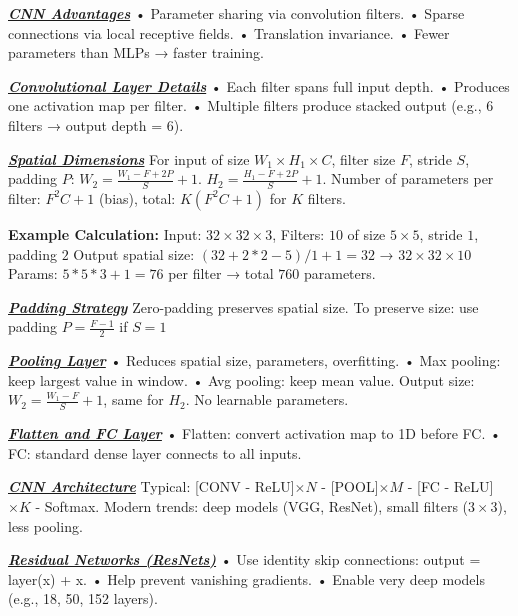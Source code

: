 \documentclass[10pt]{article}
\newcommand{\bulletPoint}[1]{\ul{\textit{\textbf{#1}}}}
\begin{document}
\begin{multicols*}{2}
\bulletPoint{CNN Advantages} \quad
• Parameter sharing via convolution filters. \quad
• Sparse connections via local receptive fields. \quad
• Translation invariance. \quad
• Fewer parameters than MLPs → faster training.

\bulletPoint{Convolutional Layer Details} \quad
• Each filter spans full input depth. \quad
• Produces one activation map per filter. \quad
• Multiple filters produce stacked output (e.g., 6 filters → output depth = 6). 

\bulletPoint{Spatial Dimensions} \quad
For input of size $W_1 \times H_1 \times C$, filter size $F$, stride $S$, padding $P$:
$W_2 = \frac{W_1 - F + 2P}{S} + 1$. \quad
$H_2 = \frac{H_1 - F + 2P}{S} + 1$. \quad
Number of parameters per filter: $F^2 C + 1$ (bias), \quad total: $K(F^2C + 1)$ for $K$ filters.\quad

\textbf{Example Calculation:} 
Input: $32 \times 32 \times 3$, Filters: $10$ of size $5 \times 5$, stride $1$, padding $2$ \quad
Output spatial size: $(32+2*2-5)/1 + 1 = 32$ → $32 \times 32 \times 10$ \quad
Params: $5*5*3 + 1 = 76$ per filter → total $760$ parameters.

\bulletPoint{Padding Strategy} \quad
Zero-padding preserves spatial size. To preserve size: use padding $P = \frac{F - 1}{2}$ if $S = 1$

\bulletPoint{Pooling Layer} \quad
• Reduces spatial size, parameters, overfitting. \quad
• Max pooling: keep largest value in window. \quad
• Avg pooling: keep mean value. \quad
Output size: $W_2 = \frac{W_1 - F}{S} + 1$, same for $H_2$. \quad No learnable parameters.

\bulletPoint{Flatten and FC Layer} \quad
• Flatten: convert activation map to 1D before FC. \quad
• FC: standard dense layer connects to all inputs.

\bulletPoint{CNN Architecture} \quad
Typical: [CONV - ReLU]$\times N$ - [POOL]$\times M$ - [FC - ReLU]$\times K$ - Softmax. \quad
Modern trends: deep models (VGG, ResNet), small filters ($3\times3$), less pooling.

\bulletPoint{Residual Networks (ResNets)} \quad
• Use identity skip connections: output = layer(x) + x. \quad
• Help prevent vanishing gradients. \quad
• Enable very deep models (e.g., 18, 50, 152 layers).



\end{multicols*}
\end{document}
